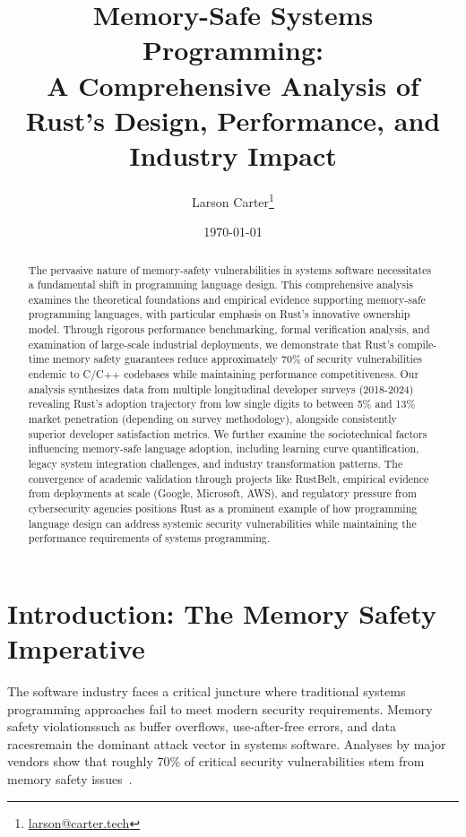 \documentclass[11pt]{article}
\title{Memory-Safe Systems Programming:\\A Comprehensive Analysis of Rust's Design, Performance, and Industry Impact}
\author{Larson Carter\thanks{\href{mailto:larson@carter.tech}{larson@carter.tech}}}
\date{\today}
\begin{document}
\maketitle
\begin{abstract}
The pervasive nature of memory-safety vulnerabilities in systems software necessitates a fundamental shift in programming language design. This comprehensive analysis examines the theoretical foundations and empirical evidence supporting memory-safe programming languages, with particular emphasis on Rust's innovative ownership model. Through rigorous performance benchmarking, formal verification analysis, and examination of large-scale industrial deployments, we demonstrate that Rust's compile-time memory safety guarantees reduce approximately 70\% of security vulnerabilities endemic to C/C++ codebases while maintaining performance competitiveness. Our analysis synthesizes data from multiple longitudinal developer surveys (2018-2024) revealing Rust's adoption trajectory from low single digits to between 5\% and 13\% market penetration (depending on survey methodology), alongside consistently superior developer satisfaction metrics. We further examine the sociotechnical factors influencing memory-safe language adoption, including learning curve quantification, legacy system integration challenges, and industry transformation patterns. The convergence of academic validation through projects like RustBelt, empirical evidence from deployments at scale (Google, Microsoft, AWS), and regulatory pressure from cybersecurity agencies positions Rust as a prominent example of how programming language design can address systemic security vulnerabilities while maintaining the performance requirements of systems programming.
\end{abstract}

\tableofcontents
\newpage

\section{Introduction: The Memory Safety Imperative}

The software industry faces a critical juncture where traditional systems programming approaches fail to meet modern security requirements. Memory safety violations\textemdash such as buffer overflows, use-after-free errors, and data races\textemdash remain the dominant attack vector in systems software. Analyses by major vendors show that roughly 70\% of critical security vulnerabilities stem from memory safety issues~\cite{msrc2019survey,google2022android}.
\end{document}
